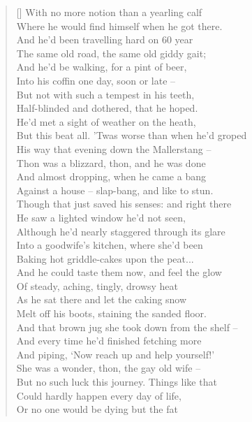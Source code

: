 \documentclass[MAIN]{subfiles}
\begin{document}
\begin{verse}[\versewidth]
With no more notion than a yearling calf\\
Where he would find himself when he got there.\\
And he'd been travelling hard on 60 year\\
The same old road, the same old giddy gait;\\
And he'd be walking, for a pint of beer,\\
Into his coffin one day, soon or late --\\
But not with such a tempest in his teeth,\\
Half-blinded and  dothered, that he hoped.\\
He'd met a sight of weather on the heath,\\
But this beat all. 'Twas worse than when he'd groped\\
His way that evening down the {\sc Mallerstang} --\\
Thon was a blizzard, thon, and he was done\\
And almost dropping, when he came a bang\\
Against a house -- slap-bang, and like to stun.\\
Though that just saved his senses: and right there\\
He saw a lighted window he'd not seen,\\
Although he'd nearly staggered through its glare\\
Into a goodwife's kitchen, where she'd been\\
Baking hot griddle-cakes upon the peat...\\
And he could taste them now, and feel the glow\\
Of steady, aching, tingly, drowsy heat\\
As he sat there and let the caking snow\\
Melt off his boots, staining the sanded floor.\\
And that brown jug she took down from the shelf --\\
And every time he'd finished fetching more\\
And piping, `Now reach up and help yourself!'\\
She was a wonder, thon, the gay old wife --\\
But no such luck this journey. Things like that\\
Could hardly happen every day of life,\\
Or no one would be dying but the fat\\

\end{verse}
\end{document}

